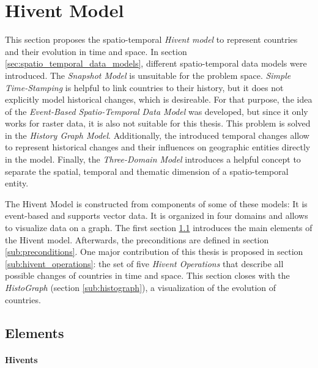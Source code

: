 
\section{Hivent Model} %
\label{sec:hivent_model}

This section proposes the spatio-temporal \emph{Hivent model} to represent countries and their evolution in time and space. In section \ref{sec:spatio_temporal_data_models}, different spatio-temporal data models were introduced. The \emph{Snapshot Model} is unsuitable for the problem space. \emph{Simple Time-Stamping} is helpful to link countries to their history, but it does not explicitly model historical changes, which is desireable. For that purpose, the idea of the \emph{Event-Based Spatio-Temporal Data Model} was developed, but since it only works for raster data, it is also not suitable for this thesis. This problem is solved in the \emph{History Graph Model}. Additionally, the introduced temporal changes allow to represent historical changes and their influences on geographic entities directly in the model. Finally, the \emph{Three-Domain Model} introduces a helpful concept to separate the spatial, temporal and thematic dimension of a spatio-temporal entity.

The Hivent Model is constructed from components of some of these models: It is event-based and supports vector data. It is organized in four domains and allows to visualize data on a graph. The first section \ref{sub:elements} introduces the main elements of the Hivent model. Afterwards, the preconditions are defined in section \ref{sub:preconditions}. One major contribution of this thesis is proposed in section \ref{sub:hivent_operations}: the set of five \emph{Hivent Operations} that describe all possible changes of countries in time and space. This section closes with the \emph{HistoGraph} (section \ref{sub:histograph}), a visualization of the evolution of countries.

\subsection{Elements} %
\label{sub:elements}

\vspace{-1em}
\paragraph{Hivents} %
\label{par:hivent}


